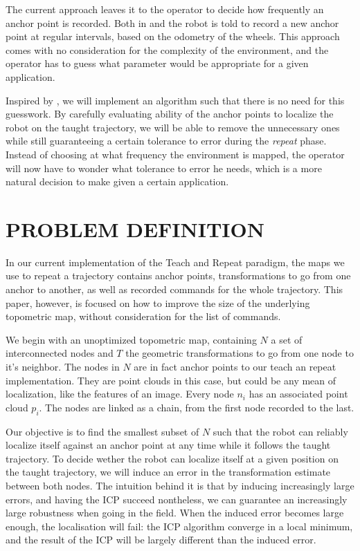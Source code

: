 \documentclass[letterpaper,10 pt,conference]{ieeeconf}
\begin{document}
The current approach leaves it to the operator to decide how frequently an anchor point is
recorded. Both in \cite{Furgale10} and \cite{Sprunk13} the robot is told to record a new anchor
point at regular intervals, based on the odometry of the wheels. This approach comes with no
consideration for the complexity of the environment, and the operator has to guess what parameter
would be appropriate for a given application.

Inspired by \cite{Churchill15}, we will implement an algorithm such that there is no need for this
guesswork. By carefully evaluating ability of the anchor points to localize the robot on the taught
trajectory, we will be able to remove the unnecessary ones while still guaranteeing a certain
tolerance to error during the \textit{repeat} phase. Instead of choosing at what frequency the
environment is mapped, the operator will now have to wonder what tolerance to error he needs, which
is a more natural decision to make given a certain application.


\section{PROBLEM DEFINITION}

In our current implementation of the Teach and Repeat paradigm, the maps we use to repeat a
trajectory contains anchor points, transformations to go from one anchor to another, as well as
recorded commands for the whole trajectory. This paper, however, is focused on how to improve the
size of the underlying topometric map, without consideration for the list of commands.

We begin with an unoptimized topometric map, containing $N$ a set of interconnected nodes and $T$
the geometric transformations to go from one node to it's neighbor. The nodes in $N$ are in fact
anchor points to our teach an repeat implementation. They are point clouds in this case, but could
be any mean of localization, like the features of an image. Every node $n_i$ has an associated point
cloud $p_i$. The nodes are linked as a chain, from the first node recorded to the last.

Our objective is to find the smallest subset of $N$ such that the robot can reliably localize itself
against an anchor point at any time while it follows the taught trajectory. To decide wether the
robot can localize itself at a given position on the taught trajectory, we will induce an error in
the transformation estimate between both nodes. The intuition behind it is that by inducing
increasingly large errors, and having the ICP succeed nontheless, we can guarantee an increasingly
large robustness when going in the field. When the induced error becomes large enough, the
localisation will fail: the ICP algorithm converge in a local minimum, and the result of the ICP will
be largely different than the induced error.
\end{document}
